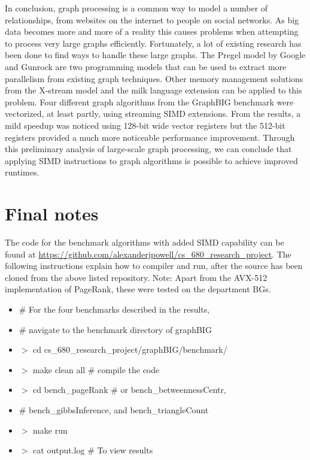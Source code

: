 \documentclass[conference]{IEEEtran}
\begin{document}
In conclusion, graph processing is a common way to model a number of relationships, from websites on the internet to people on social networks.  As big data becomes more and more of a reality this causes problems when attempting to process very large graphs efficiently.  Fortunately, a lot of existing research has been done to find ways to handle these large graphs.  The Pregel model by Google and Gunrock are two programming models that can be used to extract more parallelism from existing graph techniques.  Other memory management solutions from the X-stream model and the milk language extension can be applied to this problem.  Four different graph algorithms from the GraphBIG benchmark were vectorized, at least partly, using streaming SIMD extensions.  From the results, a mild speedup was noticed using 128-bit wide vector registers but the 512-bit registers provided a much more noticeable performance improvement.  Through this preliminary analysis of large-scale graph processing, we can conclude that applying SIMD instructions to graph algorithms is possible to achieve improved runtimes.  

\section{Final notes}
The code for the benchmark algorithms with added SIMD capability can be found at \url{https://github.com/alexanderjpowell/cs_680_research_project}.  The following instructions explain how to compiler and run, after the source has been cloned from the above listed repository.  Note: Apart from the AVX-512 implementation of PageRank, these were tested on the department BGs.  


\begin{itemize}
\item \# For the four benchmarks described in the results, 
\item \# navigate to the benchmark directory of graphBIG
\item $>$ cd cs\_680\_research\_project/graphBIG/benchmark/
\item $>$ make clean all \# compile the code
\item $>$ cd bench\_pageRank \# or bench\_betweennessCentr, 
\item \# bench\_gibbsInference, and bench\_triangleCount
\item $>$ make run
\item $>$ cat output.log \# To view results
\end{itemize}
\end{document}

